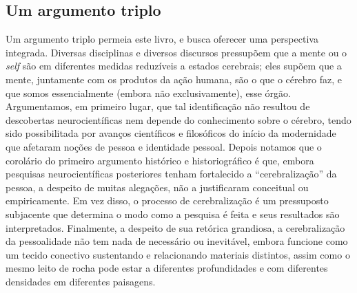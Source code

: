 \subsection{Um argumento triplo}

Um argumento triplo permeia este livro, e busca oferecer uma perspectiva
integrada. Diversas disciplinas e diversos discursos pressupõem que a
mente ou o \emph{self} são em diferentes medidas reduzíveis a estados
cerebrais; eles supõem que a mente, juntamente com os produtos da ação
humana, são o que o cérebro faz, e que somos essencialmente (embora não
exclusivamente), esse órgão. Argumentamos, em primeiro lugar, que tal
identificação não resultou de descobertas neurocientíficas nem depende
do conhecimento sobre o cérebro, tendo sido possibilitada por avanços
científicos e filosóficos do início da modernidade que afetaram noções
de pessoa e identidade pessoal. Depois notamos que o corolário do
primeiro argumento histórico e historiográfico é que, embora pesquisas
neurocientíficas posteriores tenham fortalecido a ``cerebralização'' da
pessoa, a despeito de muitas alegações, não a justificaram conceitual ou
empiricamente. Em vez disso, o processo de cerebralização é um
pressuposto subjacente que determina o modo como a pesquisa é feita e
seus resultados são interpretados. Finalmente, a despeito de sua
retórica grandiosa, a cerebralização da pessoalidade não tem nada de
necessário ou inevitável, embora funcione como um tecido conectivo
sustentando e relacionando materiais distintos, assim como o mesmo leito
de rocha pode estar a diferentes profundidades e com diferentes
densidades em diferentes paisagens.

